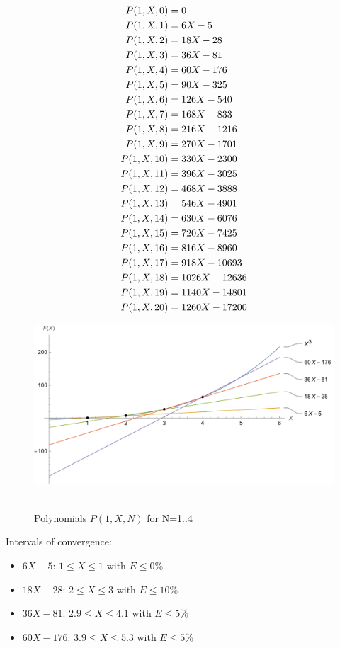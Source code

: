 ﻿\begin{align*}
    {P}(1,X,0) &= 0 \\
    {P}(1,X,1) &= 6X - 5 \\
    {P}(1,X,2) &= 18X - 28 \\
    {P}(1,X,3) &= 36X - 81 \\
    {P}(1,X,4) &= 60X - 176 \\
    {P}(1,X,5) &= 90X - 325 \\
    {P}(1,X,6) &= 126X - 540 \\
    {P}(1,X,7) &= 168X - 833 \\
    {P}(1,X,8) &= 216X - 1216 \\
    {P}(1,X,9) &= 270X - 1701 \\
    {P}(1,X,10) &= 330X - 2300 \\
    {P}(1,X,11) &= 396X - 3025 \\
    {P}(1,X,12) &= 468X - 3888 \\
    {P}(1,X,13) &= 546X - 4901 \\
    {P}(1,X,14) &= 630X - 6076 \\
    {P}(1,X,15) &= 720X - 7425 \\
    {P}(1,X,16) &= 816X - 8960 \\
    {P}(1,X,17) &= 918X - 10693 \\
    {P}(1,X,18) &= 1026X - 12636 \\
    {P}(1,X,19) &= 1140X - 14801 \\
    {P}(1,X,20) &= 1260X - 17200
\end{align*}
\begin{figure}[H]
    \centering
    \includegraphics[width=1\textwidth]{sections/images/01_plots_cubes_with_p1}
    ~\caption{Polynomials $P(1, X, N)$ for N=1..4}\label{fig:figure}
\end{figure}
Intervals of convergence:
\begin{itemize}
    \item $6X - 5$: $1 \leq X \leq 1$ with $E \leq 0\%$
    \item $18X - 28$: $2 \leq X \leq 3$ with $E \leq 10\%$
    \item $36X - 81$: $2.9 \leq X \leq 4.1$ with $E \leq 5\%$
    \item $60X - 176$: $3.9 \leq X \leq 5.3$ with $E \leq 5\%$
\end{itemize}
